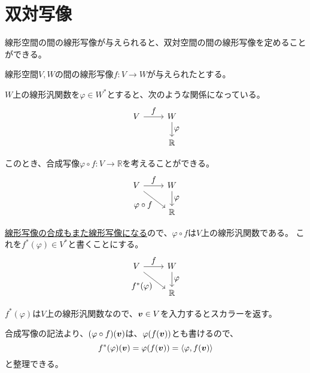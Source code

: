 \documentclass[../../../topic_linear-algebra]{subfiles}
\begin{document}
\sectionline
\section{双対写像}

線形空間の間の線形写像が与えられると、双対空間の間の線形写像を定めることができる。

\br

線形空間$V,W$の間の線形写像$f \colon V \to W$が与えられたとする。

$W$上の線形汎関数を$\varphi \in W^*$とすると、次のような関係になっている。
\begin{equation*}
  \begin{tikzcd}[every label/.append style = {font = \normalsize}]
    V \arrow[r,"f"] & W \arrow[d,"\varphi"]\\
    & \mathbb{R}
  \end{tikzcd}
\end{equation*}

このとき、合成写像$\varphi \circ f \colon V \to \mathbb{R}$を考えることができる。
\begin{equation*}
  \begin{tikzcd}[every label/.append style = {font = \normalsize}]
    V \arrow[r,"f"]\arrow[rd, "\varphi \circ f"'] & W \arrow[d,"\varphi"]\\
    & \mathbb{R}
  \end{tikzcd}
\end{equation*}

\hyperref[thm:linear-map-composition]{線形写像の合成もまた線形写像になる}ので、$\varphi \circ f$は$V$上の線形汎関数である。
これを$f^*(\varphi) \in V^*$と書くことにする。
\begin{equation*}
  \begin{tikzcd}[every label/.append style = {font = \normalsize}]
    V \arrow[r,"f"]\arrow[rd, "f^*(\varphi)"'] & W \arrow[d,"\varphi"]\\
    & \mathbb{R}
  \end{tikzcd}
\end{equation*}

$f^*(\varphi)$は$V$上の線形汎関数なので、$\vb*{v} \in V$を入力するとスカラーを返す。

合成写像の記法より、$(\varphi \circ f)(\vb*{v})$は、$\varphi(f(\vb*{v}))$とも書けるので、
\begin{equation*}
  f^*(\varphi)(\vb*{v}) = \varphi(f(\vb*{v})) = \langle \varphi, f(\vb*{v}) \rangle
\end{equation*}
と整理できる。
\end{document}
